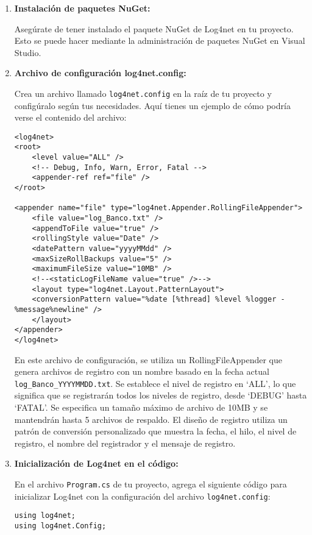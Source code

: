\documentclass[executivepaper]{article}
\begin{document}
\begin{enumerate}
  \item \textbf{Instalación de paquetes NuGet:}
  
  Asegúrate de tener instalado el paquete NuGet de Log4net en tu proyecto. Esto se puede hacer mediante la administración de paquetes NuGet en Visual Studio.
  
  \item \textbf{Archivo de configuración log4net.config:}
  
  Crea un archivo llamado \texttt{log4net.config} en la raíz de tu proyecto y configúralo según tus necesidades. Aquí tienes un ejemplo de cómo podría verse el contenido del archivo:
  
  \begin{lstlisting}
<log4net>
<root>
    <level value="ALL" />
    <!-- Debug, Info, Warn, Error, Fatal -->
    <appender-ref ref="file" />
</root>

<appender name="file" type="log4net.Appender.RollingFileAppender">
    <file value="log_Banco.txt" />
    <appendToFile value="true" />
    <rollingStyle value="Date" />
    <datePattern value="yyyyMMdd" />
    <maxSizeRollBackups value="5" />
    <maximumFileSize value="10MB" />
    <!--<staticLogFileName value="true" />-->
    <layout type="log4net.Layout.PatternLayout">
    <conversionPattern value="%date [%thread] %level %logger - %message%newline" />
    </layout>
</appender>
</log4net>
\end{lstlisting}
En este archivo de configuración, se utiliza un RollingFileAppender que genera archivos de registro con un nombre basado en la fecha actual \lstinline{log_Banco_YYYYMMDD.txt}. Se establece el nivel de registro en \enquote*{ALL}, lo que significa que se registrarán todos los niveles de registro, desde \enquote*{DEBUG} hasta \enquote*{FATAL}. Se especifica un tamaño máximo de archivo de 10MB y se mantendrán hasta 5 archivos de respaldo. El diseño de registro utiliza un patrón de conversión personalizado que muestra la fecha, el hilo, el nivel de registro, el nombre del registrador y el mensaje de registro.

\item \textbf{Inicialización de Log4net en el código:}
  
  En el archivo \texttt{Program.cs} de tu proyecto, agrega el siguiente código para inicializar Log4net con la configuración del archivo \texttt{log4net.config}:
  
\begin{lstlisting}
using log4net;
using log4net.Config;


\end{lstlisting}
\end{enumerate}
\end{document}
